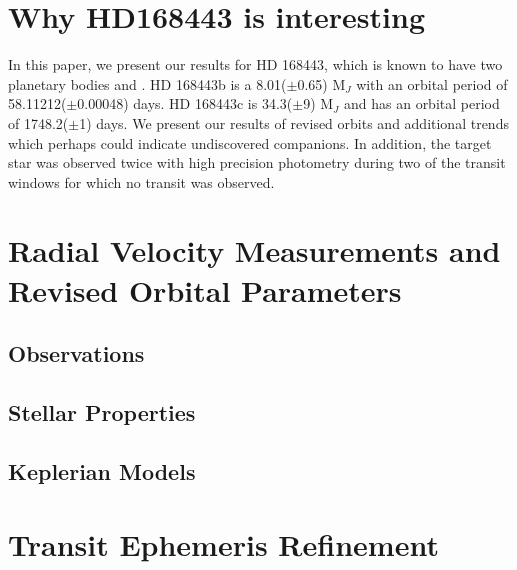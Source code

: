 \documentclass[12pt,preprint]{emulateapj}
\begin{document}

\section{Why HD168443 is interesting}
\label{motivation}
  In this paper, we present our results for HD 168443, which is known to have two planetary bodies \citet{Marcy01} and \citet{Udry01}. HD 168443b is a 8.01($\pm$0.65) M$_J$ \citet{Wright01} with an orbital period of 58.11212($\pm$0.00048) days. HD 168443c is 34.3($\pm$9) M$_J$ and has an orbital period of 1748.2($\pm$1) days. We present our results of revised orbits and additional trends which perhaps could indicate undiscovered companions. In addition, the target star was observed twice with high precision photometry during two of the transit windows for which no transit was observed.


\section{Radial Velocity Measurements and Revised Orbital Parameters}
\label{revisedop}


\subsection{Observations}


\subsection{Stellar Properties}
\label{steprop}




\subsection{Keplerian Models}






\section{Transit Ephemeris Refinement}
\label{ephemeris}
\end{document}
